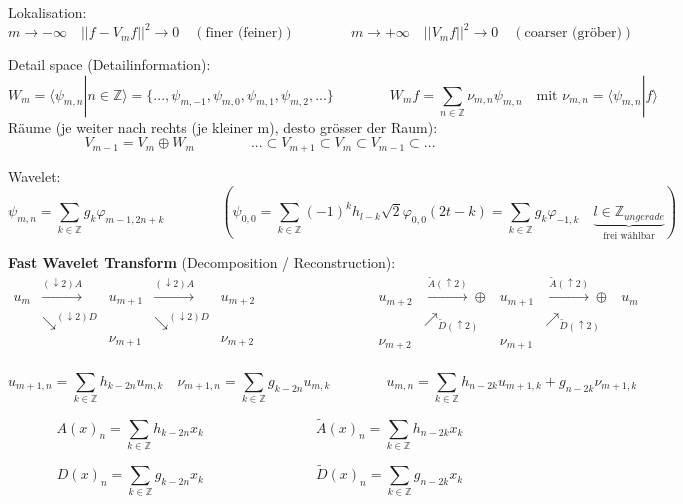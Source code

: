 Lokalisation:
\[  
	m \rightarrow -\infty \quad ||f-V_mf||^2 \rightarrow 0 \quad (\text{finer (feiner)})
	\qquad \qquad
	m \rightarrow +\infty \quad ||V_mf||^2 \rightarrow 0 \quad (\text{coarser (gröber)})
\]

Detail space (Detailinformation):
\[
	W_m = \langle \psi_{m,n} | n \in \mathbb{Z} \rangle = \{ ...,\psi_{m,-1},\psi_{m,0}, \psi_{m,1}, \psi_{m,2},... \}
	\qquad \qquad
	W_mf = \sum_{n \in \mathbb{Z}} \nu_{m,n}\psi_{m,n} \quad \text{mit } \nu_{m,n}=\langle \psi_{m,n}|f \rangle
\]
Räume (je weiter nach rechts (je kleiner m), desto grösser der Raum):
\[ V_{m-1} = V_m \oplus W_m  \qquad \qquad ...\subset V_{m+1} \subset V_{m} \subset V_{m-1} \subset ... \]

Wavelet:
\[
	\psi_{m,n} = \sum_{k \in \mathbb{Z}} g_k \varphi_{m-1,2n+k} 
	\qquad \qquad 
	\left(\psi_{0,0}=\sum_{k \in \mathbb{Z}} (-1)^k h_{l-k} \sqrt{2}  \varphi_{0,0}(2t-k) = \sum_{k \in \mathbb{Z}} g_k \varphi_{-1,k} \quad \underbrace{l \in \mathbb{Z}_{ungerade}}_{\text{frei wählbar}} \right)
\]

\textbf{Fast Wavelet Transform} (Decomposition / Reconstruction):
\[
	\boxed{\begin{array}{ccccc}
		u_m & \xrightarrow{(\downarrow 2)A} & u_{m+1} & \xrightarrow{(\downarrow 2)A} & u_{m+2} \\
		& \searrow^{(\downarrow 2)D} & & \searrow^{(\downarrow 2)D} & \\
		& & \nu_{m+1} & & \nu_{m+2} \\
	\end{array}}
	\qquad \qquad \qquad \qquad
	\boxed{\begin{array}{ccccc}
		u_{m+2} & \xrightarrow{\tilde{A}(\uparrow 2)} \oplus& u_{m+1} & \xrightarrow{\tilde{A}(\uparrow 2)} \oplus & u_{m} \\
		& \nearrow_{\tilde{D} (\uparrow 2)} & & \nearrow_{\tilde{D} (\uparrow 2)} & \\
		\nu_{m+2}& & \nu_{m+1} & & \\
	\end{array}}
\]

\[  
	u_{m+1,n} = \sum_{k \in  \mathbb{Z}} h_{k-2n} u_{m,k} \quad \nu_{m+1,n} = \sum_{k \in  \mathbb{Z}} g_{k-2n} u_{m,k}
	\qquad \qquad
	u_{m,n} = \sum_{k \in  \mathbb{Z}} h_{n-2k} u_{m+1,k} + g_{n-2k} \nu_{m+1,k}
\]

\[
	A(x)_n = \sum_{k \in  \mathbb{Z}} h_{k-2n} x_k
	\qquad \qquad \qquad \qquad
	\tilde{A}(x)_n = \sum_{k \in  \mathbb{Z}} h_{n-2k} x_k
\]

\[
	D(x)_n = \sum_{k \in  \mathbb{Z}} g_{k-2n} x_k
	\qquad \qquad \qquad \qquad
	\tilde{D}(x)_n = \sum_{k \in  \mathbb{Z}} g_{n-2k} x_k
\]

